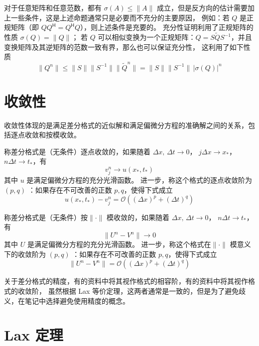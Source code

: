 \begin{remark}
    对于任意矩阵和任意范数，都有 $\sigma(A) \le \|A\|$ 成立，但是反方向的估计需要加上一些条件，这是上述命题通常只是必要而不充分的主要原因，
    例如：若 $Q$ 是正规矩阵（即 $Q Q^\mathsf{H} = Q^\mathsf{H} Q$），则上述条件是充要的。
    充分性证明利用了正规矩阵的性质 $\sigma(Q) = \| Q \|$；
    若 $Q$ 可以相似变换为一个正规矩阵：$Q = S \tilde{Q} S^{-1}$，并且变换矩阵及其逆矩阵的范数一致有界，那么也可以保证充分性，
    这利用了如下性质
    \[
        \| Q^n \| \le \| S \| \| S^{-1} \| \| \tilde{Q}^n \| = \| S \| \| S^{-1} \|\, |\sigma(Q)|^n
    \]
\end{remark}


\section{收敛性}

收敛性体现的是满足差分格式的近似解和满足偏微分方程的准确解之间的关系，包括逐点收敛和按模收敛。


\begin{definition}[逐点收敛性]
    称差分格式是（无条件）逐点收敛的，如果随着 $\Delta x,\,\Delta t \to 0$，
    $j\Delta x \to x_*$，$n \Delta t \to t_*$，有
    \[
        v_j^n \to u(x_*,t_*)
    \]
    其中 $u$ 是满足偏微分方程的充分光滑函数。
    进一步，称这个格式的逐点收敛阶为 $(p,q)$ ：如果存在不可改善的正数 $p,q$，使得下式成立
    \[
        u(x_*,t_*) - v_j^n = \mathcal{O}((\Delta x)^p + (\Delta t)^q)
    \]
\end{definition}

\begin{definition}[模收敛性]
    称差分格式是（无条件）按$\| \cdot \|$ 模收敛的，如果随着 $\Delta x,\,\Delta t \to 0$，
    $n \Delta t \to t_*$，有
    \[
        \|U^n - V^n\| \to 0
    \]
    其中 $U$ 是满足偏微分方程的充分光滑函数。
    进一步，称这个格式在$\|\cdot\|$ 模意义下的收敛阶为 $(p,q)$ ：如果存在不可改善的正数 $p,q$，使得下式成立
    \[
        \|U^n - V^n\| = \mathcal{O}((\Delta x)^p + (\Delta t)^q)
    \]
\end{definition}

\begin{remark}
    关于差分格式的精度，有的资料中将其视作格式的相容阶，有的资料中将其视作格式的收敛阶，
    虽然根据 Lax 等价定理，这两者通常是一致的，但是为了避免歧义，在笔记中选择避免使用精度的概念。
\end{remark}

\section{Lax 定理}

